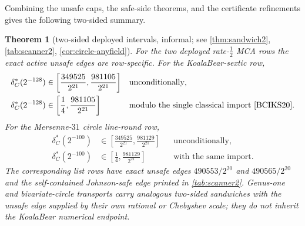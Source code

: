 \documentclass[11pt]{article}
\newtheorem{theorem}{Theorem}[section]
\theoremstyle{definition}
\theoremstyle{remark}
\begin{document}
Combining the unsafe caps, the safe-side theorems, and the certificate refinements gives the following two-sided summary.

\begin{theorem}[two-sided deployed intervals, informal; see \cref{thm:sandwich2}, \cref{tab:scanner2}, \cref{cor:circle-anyfield}]\label{thm:informal-sandwich}
For the two deployed rate-$\tfrac12$ MCA rows the exact active unsafe edges are row-specific.  For the KoalaBear-sextic row,
\begin{align*}
\delta^*_C(2^{-128})
&\in\left[\frac{349525}{2^{21}},\frac{981105}{2^{21}}\right]
&&\text{unconditionally},\\
\delta^*_C(2^{-128})
&\in\left[\frac14,\frac{981105}{2^{21}}\right]
&&\text{modulo the single classical import \cite{BCIKS20}.}
\end{align*}
For the Mersenne-$31$ circle line-round row,
\begin{align*}
\delta^*_C(2^{-100})
&\in\left[\frac{349525}{2^{21}},\frac{981129}{2^{21}}\right]
&&\text{unconditionally},\\
\delta^*_C(2^{-100})
&\in\left[\frac14,\frac{981129}{2^{21}}\right]
&&\text{with the same import.}
\end{align*}
The corresponding list rows have exact unsafe edges $490553/2^{20}$ and $490565/2^{20}$ and the self-contained Johnson-safe edge printed in \cref{tab:scanner2}.  Genus-one and bivariate-circle transports carry analogous two-sided sandwiches with the unsafe edge supplied by their own rational or Chebyshev scale; they do not inherit the KoalaBear numerical endpoint.
\end{theorem}
\end{document}
